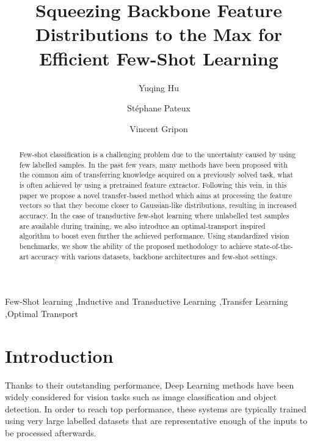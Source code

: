 \documentclass[review]{elsarticle}
\begin{document}
\begin{frontmatter}

\title{Squeezing Backbone Feature Distributions to the Max for Efficient Few-Shot Learning}




\author[orange,imt]{Yuqing Hu}


\author[orange]{St\'ephane Pateux}
\author[imt]{Vincent Gripon}


\address[orange]{Orange Labs, Rennes, France}
\address[imt]{IMT Atlantique, Lab-STICC, UMR CNRS 6285, F-29238, France}

\begin{abstract}
Few-shot classification is a challenging problem due to the uncertainty caused by using few labelled samples. In the past few years, many methods have been proposed with the common aim of transferring knowledge acquired on a previously solved task, what is often achieved by using a pretrained feature extractor. Following this vein, in this paper we propose a novel transfer-based method which aims at processing the feature vectors so that they become closer to Gaussian-like distributions, resulting in increased accuracy. In the case of transductive few-shot learning where unlabelled test samples are available during training, we also introduce an optimal-transport inspired algorithm to boost even further the achieved performance. Using standardized vision benchmarks, we show the ability of the proposed methodology to achieve state-of-the-art accuracy with various datasets, backbone architectures and few-shot settings.
\end{abstract}

\begin{keyword}
Few-Shot learning \sep Inductive and Transductive Learning \sep Transfer Learning \sep Optimal Transport
\end{keyword}

\end{frontmatter}



\section{Introduction}
\label{introduction}

Thanks to their outstanding performance, Deep Learning methods have been widely considered for vision tasks such as image classification and object detection. In order to reach top performance, these systems are typically trained using very large labelled datasets that are representative enough of the inputs to be processed afterwards.
\end{document}
